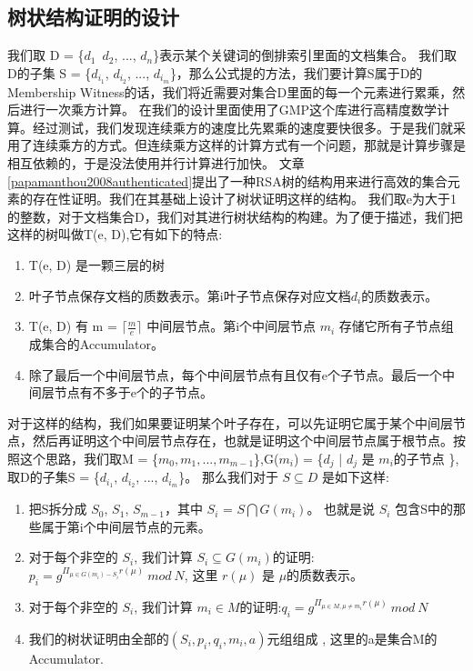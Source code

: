 \subsection{树状结构证明的设计}

我们取 D = \{$d_1$\, $d_2$, ..., $d_n$\}表示某个关键词的倒排索引里面的文档集合。
我们取D的子集 S = \{$d_{i_1}$, $d_{i_2}$, ..., $d_{i_m}$\}，那么公式提的方法，我们要计算S属于D的Membership Witness的话，我们将近需要对集合D里面的每一个元素进行累乘，然后进行一次乘方计算。
在我们的设计里面使用了GMP这个库进行高精度数学计算。经过测试，我们发现连续乘方的速度比先累乘的速度要快很多。于是我们就采用了连续乘方的方式。但连续乘方这样的计算方式有一个问题，那就是计算步骤是相互依赖的，于是没法使用并行计算进行加快。
文章\ref{papamanthou2008authenticated}提出了一种RSA树的结构用来进行高效的集合元素的存在性证明。我们在其基础上设计了树状证明这样的结构。
我们取e为大于1的整数，对于文档集合D，我们对其进行树状结构的构建。为了便于描述，我们把这样的树叫做T(e, D),它有如下的特点:
\begin{enumerate}
  \item T(e, D) 是一颗三层的树
  \item 叶子节点保存文档的质数表示。第i叶子节点保存对应文档$d_i$的质数表示。
  \item T(e, D) 有 m = $\lceil \frac{m}{e} \rceil$ 中间层节点。第i个中间层节点 $m_i$ 存储它所有子节点组成集合的Accumulator。
  \item 除了最后一个中间层节点，每个中间层节点有且仅有e个子节点。最后一个中间层节点有不多于e个的子节点。
\end{enumerate}

对于这样的结构，我们如果要证明某个叶子存在，可以先证明它属于某个中间层节点，然后再证明这个中间层节点存在，也就是证明这个中间层节点属于根节点。按照这个思路，我们取M = \{$m_0, m_1, ..., m_{m-1}$\},G($m_i$) = \{$d_j$ | $d_j$ 是 $m_i$的子节点 \}, 取D的子集S = \{$d_{i_1}$, $d_{i_2}$, ..., $d_{i_m}$\}。 那么我们对于 $S \subseteq D$ 是如下这样:
\begin{enumerate}
  \item 把S拆分成 $S_0$, $S_1$, $S_{m-1}$，其中 $S_i$ = $S \bigcap G(m_i)$。 也就是说 $S_i$ 包含S中的那些属于第i个中间层节点的元素。
  \item 对于每个非空的 $S_i$, 我们计算 $S_i \subseteq G(m_i)$的证明: $p_i = g^{\Pi_{\mu \in G(m_i) - S_i} r(\mu)}\ mod\ N$, 这里 $r(\mu)$ 是 $\mu$的质数表示。 
  \item 对于每个非空的 $S_i$, 我们计算 $m_i \in M$的证明:$q_i =  g^{\Pi_{\mu \in M, \mu \ne m_i} r(\mu)}\ mod\ N$
  \item 我们的树状证明由全部的$(S_i, p_i, q_i, m_i, a)$元组组成 , 这里的a是集合M的Accumulator.
\end{enumerate}

